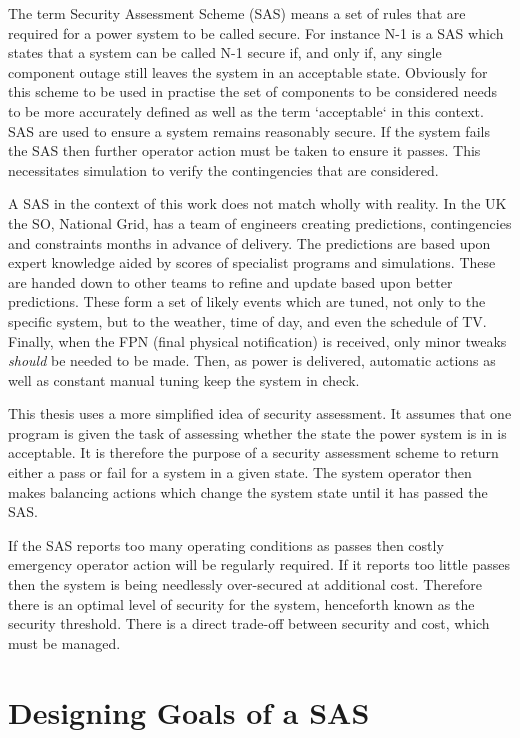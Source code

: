 \documentclass[a4paper,oneside,12pt]{report}
\begin{document}
The term Security Assessment Scheme (SAS) means a set of rules that are required for a power system to be called secure. For instance N-1 is a SAS which states that a system can be called N-1 secure if, and only if, any single component outage still leaves the system in an acceptable state. Obviously for this scheme to be used in practise the set of components to be considered needs to be more accurately defined as well as the term `acceptable` in this context. SAS are used to ensure a system remains reasonably secure. If the system fails the SAS then further operator action must be taken to ensure it passes. This necessitates simulation to verify the contingencies that are considered.

A SAS in the context of this work does not match wholly with reality. In the UK the SO, National Grid, has a team of engineers creating predictions, contingencies and constraints months in advance of delivery. The predictions are based upon expert knowledge aided by scores of specialist programs and simulations. These are handed down to other teams to refine and update based upon better predictions. These form a set of likely events which are tuned, not only to the specific system, but to the weather, time of day, and even the schedule of TV. Finally, when the FPN (final physical notification) is received, only minor tweaks \emph{should} be needed to be made. Then, as power is delivered, automatic actions as well as constant manual tuning keep the system in check.

This thesis uses a more simplified idea of security assessment. It assumes that one program is given the task of assessing whether the state the power system is in is acceptable. It is therefore the purpose of a security assessment scheme to return either a pass or fail for a system in a given state. The system operator then makes balancing actions which change the system state until it has passed the SAS.

If the SAS reports too many operating conditions as passes then costly emergency operator action will be regularly required. If it reports too little passes then the system is being needlessly over-secured at additional cost. Therefore there is an optimal level of security for the system, henceforth known as the security threshold. There is a direct trade-off between security and cost, which must be managed.

\section{Designing Goals of a SAS}\label{lbl_sec_design_goals}
\end{document}
